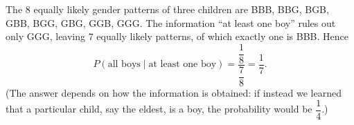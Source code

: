 The $8$ equally likely gender patterns of three children are BBB, BBG, BGB, GBB, BGG, GBG, GGB, GGG. The information ``at least one boy'' rules out only GGG, leaving $7$ equally likely patterns, of which exactly one is BBB. Hence
\[
P(\text{all boys}\mid\text{at least one boy})=\dfrac{\dfrac{1}{8}}{\dfrac{7}{8}}=\boxed{\dfrac{1}{7}}.
\]
(The answer depends on how the information is obtained: if instead we learned that a particular child, say the eldest, is a boy, the probability would be $\dfrac{1}{4}$.)
